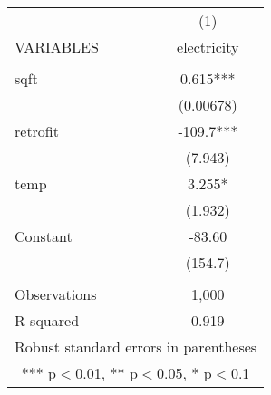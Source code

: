 \documentclass[]{article}
\begin{document}
\begin{tabular}{lc} \hline
 & (1) \\
VARIABLES & electricity \\ \hline
 &  \\
sqft & 0.615*** \\
 & (0.00678) \\
retrofit & -109.7*** \\
 & (7.943) \\
temp & 3.255* \\
 & (1.932) \\
Constant & -83.60 \\
 & (154.7) \\
 &  \\
Observations & 1,000 \\
 R-squared & 0.919 \\ \hline
\multicolumn{2}{c}{ Robust standard errors in parentheses} \\
\multicolumn{2}{c}{ *** p$<$0.01, ** p$<$0.05, * p$<$0.1} \\
\end{tabular}
\end{document}
